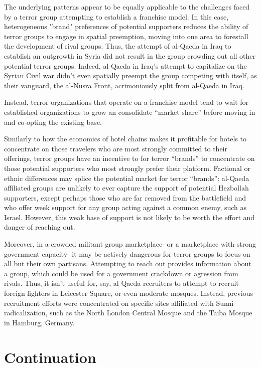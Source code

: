 \documentclass{article}
\begin{document}
The underlying patterns appear to be equally applicable to the
challenges faced by a terror group attempting to establish a franchise
model. In this case, heterogeneous "brand" preferences of potential supporters
reduces the ability of terror groups to engage in spatial preemption,
moving into one area to forestall the development of rival
groups. Thus, the attempt of al-Qaeda in Iraq to establish an
outgrowth in Syria did not result in the group crowding out all other
potential terror groups. Indeed, al-Qaeda in Iraq's attempt to
capitalize on the Syrian Civil war didn't even spatially preempt the
group competing with itself, as their vanguard, the al-Nusra Front,
acrimoniously split from al-Qaeda in Iraq.

 Instead, terror organizations that operate on a franchise model tend
 to wait for established organizations to grow an consolidate ``market
 share'' before moving in and co-opting the existing base.

Similarly to how the economics of hotel chains makes it profitable for
hotels to concentrate on those travelers who are most strongly
committed to their offerings, terror groups have an incentive to for
terror ``brands'' to concentrate on those potential supporters who
most strongly prefer their platform. Factional or ethnic differences
may splice the potential market for terror ``brands'': al-Qaeda
affiliated groups are unlikely to ever capture the support of
potential Hezbollah supporters, except perhaps those who are far
removed from the battlefield and who offer week support for any group
acting against a common enemy, such as Israel. However, this weak base
of support is not likely to be worth the effort and danger of reaching
out. 

Moreover, in a crowded militant group marketplace- or a marketplace
with strong government capacity- it may be actively
dangerous for terror groups to focus on all but their own
partisans. Attempting to reach out provides information about a group,
which could be used for a government crackdown or  agression from
rivals. Thus, it isn't useful for, say, al-Qaeda recruiters to attempt to recruit
foreign fighters in Leicester Square, or even moderate mosques.
Instead, previous recruitment efforts were concentrated on specific
sites affiliated with Sunni radicalization, such as the North
London Central Mosque and the Taiba Mosque in Hamburg, Germany.


\section{Continuation}
\end{document}
